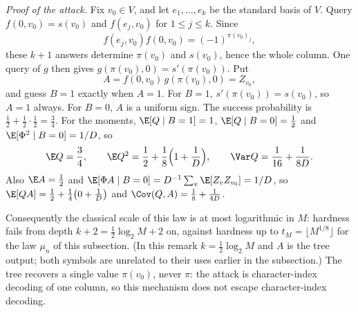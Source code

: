 \begin{remark}
\emph{Proof of the attack.} Fix \(v_0\in V\), and let \(e_1,\ldots,e_k\) be the standard basis of \(V\). Query \(f(0,v_0)=s(v_0)\) and \(f(e_j,v_0)\) for \(1\le j\le k\). Since
\[
 f(e_j,v_0)f(0,v_0)=(-1)^{\pi(v_0)_j},
\]
these \(k+1\) answers determine \(\pi(v_0)\) and \(s(v_0)\), hence the whole column. One query of \(g\) then gives \(g(\pi(v_0),0)=s'(\pi(v_0))\). Put
\[
 A=f(0,v_0)\,g(\pi(v_0),0)=Z_{v_0},
\]
and guess \(B=1\) exactly when \(A=1\). For \(B=1\), \(s'(\pi(v_0))=s(v_0)\), so \(A=1\) always. For \(B=0\), \(A\) is a uniform sign. The success probability is \(\frac12+\frac12\cdot\frac12=\frac34\). For the moments, \(\E[Q\mid B=1]=1\), \(\E[Q\mid B=0]=\frac12\) and \(\E[\Phi^2\mid B=0]=1/D\), so
\[
 \E Q=\frac34,\qquad
 \E Q^2=\frac12+\frac18\Bigl(1+\frac1D\Bigr),\qquad
 \Var Q=\frac1{16}+\frac1{8D}.
\]
Also \(\E A=\frac12\) and \(\E[\Phi A\mid B=0]=D^{-1}\sum_v\E[Z_vZ_{v_0}]=1/D\), so
\(\E[QA]=\frac12+\frac14\bigl(0+\frac1D\bigr)\) and \(\Cov(Q,A)=\frac18+\frac1{4D}\).

Consequently the classical scale of this law is at most logarithmic in \(M\): hardness fails from depth \(k+2=\frac12\log_2M+2\) on, against hardness up to \(t_M=\lfloor M^{1/8}\rfloor\) for the law \(\mu_n\) of this subsection. (In this remark \(k=\frac12\log_2M\) and \(A\) is the tree output; both symbols are unrelated to their uses earlier in the subsection.) The tree recovers a single value \(\pi(v_0)\), never \(\pi\): the attack is character-index decoding of one column, so this mechanism does not escape character-index decoding.
\end{remark}

